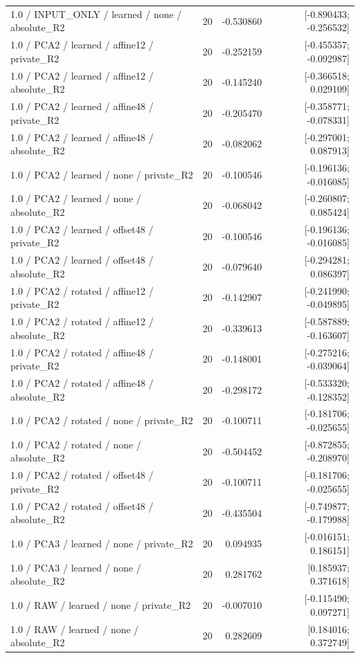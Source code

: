 \begin{longtable}{p{.56\linewidth}rrr}
1.0 / INPUT\_ONLY / learned / none / absolute\_R2 & 20 & -0.530860 & [-0.890433; -0.256532] \\
1.0 / PCA2 / learned / affine12 / private\_R2 & 20 & -0.252159 & [-0.455357; -0.092987] \\
1.0 / PCA2 / learned / affine12 / absolute\_R2 & 20 & -0.145240 & [-0.366518; 0.029109] \\
1.0 / PCA2 / learned / affine48 / private\_R2 & 20 & -0.205470 & [-0.358771; -0.078331] \\
1.0 / PCA2 / learned / affine48 / absolute\_R2 & 20 & -0.082062 & [-0.297001; 0.087913] \\
1.0 / PCA2 / learned / none / private\_R2 & 20 & -0.100546 & [-0.196136; -0.016085] \\
1.0 / PCA2 / learned / none / absolute\_R2 & 20 & -0.068042 & [-0.260807; 0.085424] \\
1.0 / PCA2 / learned / offset48 / private\_R2 & 20 & -0.100546 & [-0.196136; -0.016085] \\
1.0 / PCA2 / learned / offset48 / absolute\_R2 & 20 & -0.079640 & [-0.294281; 0.086397] \\
1.0 / PCA2 / rotated / affine12 / private\_R2 & 20 & -0.142907 & [-0.241990; -0.049895] \\
1.0 / PCA2 / rotated / affine12 / absolute\_R2 & 20 & -0.339613 & [-0.587889; -0.163607] \\
1.0 / PCA2 / rotated / affine48 / private\_R2 & 20 & -0.148001 & [-0.275216; -0.039064] \\
1.0 / PCA2 / rotated / affine48 / absolute\_R2 & 20 & -0.298172 & [-0.533320; -0.128352] \\
1.0 / PCA2 / rotated / none / private\_R2 & 20 & -0.100711 & [-0.181706; -0.025655] \\
1.0 / PCA2 / rotated / none / absolute\_R2 & 20 & -0.504452 & [-0.872855; -0.208970] \\
1.0 / PCA2 / rotated / offset48 / private\_R2 & 20 & -0.100711 & [-0.181706; -0.025655] \\
1.0 / PCA2 / rotated / offset48 / absolute\_R2 & 20 & -0.435504 & [-0.749877; -0.179988] \\
1.0 / PCA3 / learned / none / private\_R2 & 20 & 0.094935 & [-0.016151; 0.186151] \\
1.0 / PCA3 / learned / none / absolute\_R2 & 20 & 0.281762 & [0.185937; 0.371618] \\
1.0 / RAW / learned / none / private\_R2 & 20 & -0.007010 & [-0.115490; 0.097271] \\
1.0 / RAW / learned / none / absolute\_R2 & 20 & 0.282609 & [0.184016; 0.372749] \\

\end{longtable}
